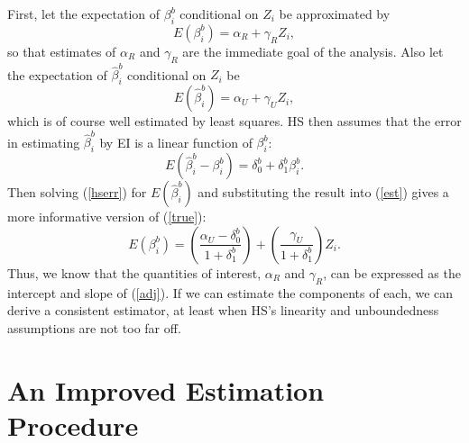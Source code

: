 \documentclass[11pt,titlepage]{article}
\begin{document}
First, let the expectation of $\beta_i^b$ conditional on $Z_i$ be
approximated by
\begin{equation}
  \label{true}
  E(\beta_i^b)=\alpha_R+\gamma_R Z_i,
\end{equation}
so that estimates of $\alpha_R$ and $\gamma_R$ are the immediate goal
of the analysis.  Also let the expectation of $\hat\beta_i^b$
conditional on $Z_i$ be
\begin{equation}
  \label{est}
  E(\hat\beta_i^b)=\alpha_U+\gamma_U Z_i,
\end{equation}
which is of course well estimated by least squares.  HS then assumes
that the error in estimating $\hat\beta_i^b$ by EI is a linear
function of $\beta_i^b$:
\begin{equation}
  \label{hserr}
  E(\hat\beta_i^b - \beta_i^b) = \delta_0^b + \delta_1^b\beta_i^b.
\end{equation}
Then solving (\ref{hserr}) for $E(\hat\beta_i^b)$ and substituting the
result into (\ref{est}) gives a more informative version of (\ref{true}):
\begin{equation}
  \label{adj}
  E(\beta_i^b) = \left(\frac{\alpha_U-\delta_0^b}{1+\delta_1^b}\right)
  + \left(\frac{\gamma_U}{1+\delta_1^b}\right)Z_i.
\end{equation}
Thus, we know that the quantities of interest, $\alpha_R$ and
$\gamma_R$, can be expressed as the intercept and slope of
(\ref{adj}).  If we can estimate the components of each, we can derive
a consistent estimator, at least when HS's linearity and unboundedness
assumptions are not too far off.

\section{An Improved Estimation Procedure}
\end{document}

